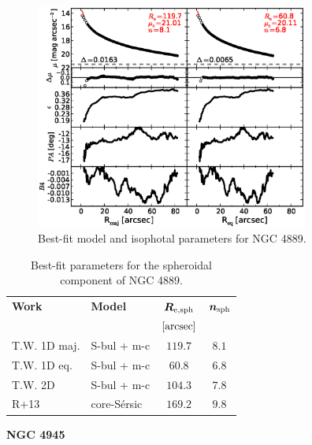 \documentclass[preprint2]{emulateapj}
\newcommand{\fitfigurewidth}{0.8\textwidth}
\begin{document}
  \begin{figure}[h]
  \begin{center}
  \includegraphics[width=\fitfigurewidth]{images/n4889_1Dfit.eps}
  \caption{Best-fit model and isophotal parameters for NGC 4889.}
  \end{center}
  \end{figure}

  \begin{table}[h]
  \small
  \caption{Best-fit parameters for the spheroidal component of NGC 4889.}
  \begin{center}
  \begin{tabular}{llcc}
  \hline
  {\bf Work} & {\bf Model}   & $\bm R_{\rm e,sph}$    & $\bm n_{\rm sph}$ \\
    &  &  $[\rm arcsec]$ & \\
  \hline
  T.W. 1D maj. & S-bul + m-c & $119.7$  &  $8.1$ \\
  T.W. 1D eq.  & S-bul + m-c & $60.8$	&  $6.8$ \\
  T.W. 2D      & S-bul + m-c & $104.3$  &  $7.8$ \\
  \hline
  R+13         & core-S\'ersic & $169.2$  &  $9.8$ \\
  \hline
  \end{tabular}
  \end{center}
  \label{tab:n4889}
  \end{table}
    
  \clearpage\newpage\noindent
  {\bf NGC 4945 \\}
\end{document}
